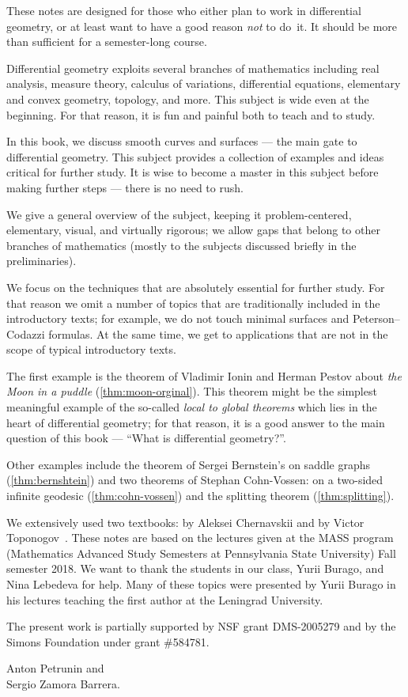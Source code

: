 \vfill

\newpage
{}
{}
\thispagestyle{myheadings}

These notes are designed for those who either plan to work in differential geometry,
or at least want to have a good reason {}\emph{not} to do~it.
It should be more than sufficient for a semester-long course. 

Differential geometry exploits several branches of mathematics including 
real analysis, 
measure theory,
calculus of variations,
differential equations,
elementary and convex geometry,
topology, and more.
This subject is wide even at the beginning. 
For that reason, it is fun and painful both to teach and to study.

In this book, we discuss smooth curves and surfaces --- the main gate to differential geometry.
This subject provides a collection of examples and ideas critical for further study.
It is wise to become a master in this subject before making further steps --- there is no need to rush.

We give a general overview of the subject, keeping it
problem-centered,
elementary, 
visual, 
and virtually rigorous; we allow gaps that belong to other branches of mathematics (mostly to the subjects discussed briefly in the preliminaries).

We focus on the techniques that are absolutely essential for further study.
For  that reason we omit a number of topics that are traditionally included in the introductory texts;
for example, we do not touch %
minimal surfaces and Peterson--Codazzi formulas.
At the same time, we get to applications
 that are not in the scope of typical introductory texts.
 
The first example is the theorem of Vladimir Ionin and Herman Pestov about {}\emph{the Moon in a puddle} (\ref{thm:moon-orginal}).
This theorem might be the simplest meaningful example of the so-called {}\emph{local to global theorems} which lies in the heart of differential geometry;
for that reason, it is a good answer to the main question of this book --- ``What is differential geometry?''.

Other examples include the theorem of Sergei Bernstein's on saddle graphs (\ref{thm:bernshtein}) and two theorems of Stephan Cohn-Vossen:
on a two-sided infinite geodesic (\ref{thm:cohn-vossen})
and the splitting theorem (\ref{thm:splitting}).

We extensively used two textbooks: by Aleksei Chernavskii \cite{chernavsky} and by Victor Toponogov~\cite{toponogov-book}.
These notes are based on the lectures given at the MASS program (Mathematics Advanced Study Semesters at Pennsylvania State University) Fall semester 2018.
We want to thank the students in our class, Yurii Burago, and Nina Lebedeva for help.
Many of these topics were presented by Yurii Burago in his lectures teaching the first author at the Leningrad University.

The present work is partially supported by NSF grant DMS-2005279
and by the Simons Foundation under grant \#584781.

\begin{flushright}
Anton Petrunin and\\
Sergio Zamora Barrera.
\end{flushright}




